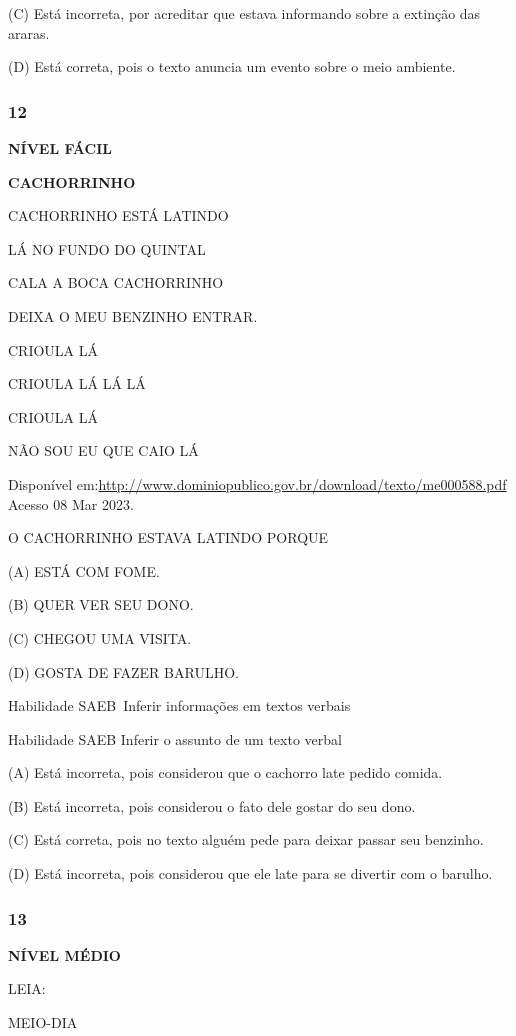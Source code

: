 (C) Está incorreta, por acreditar que estava informando sobre a extinção
das araras.

(D) Está correta, pois o texto anuncia um evento sobre o meio ambiente.

\subsubsection{12}\label{section-105}

\textbf{NÍVEL FÁCIL}

\textbf{CACHORRINHO}

CACHORRINHO ESTÁ LATINDO

LÁ NO FUNDO DO QUINTAL

CALA A BOCA CACHORRINHO

DEIXA O MEU BENZINHO ENTRAR.

CRIOULA LÁ

CRIOULA LÁ LÁ LÁ

CRIOULA LÁ

NÃO SOU EU QUE CAIO LÁ

Disponível
em:\url{http://www.dominiopublico.gov.br/download/texto/me000588.pdf}
Acesso 08 Mar 2023.

O CACHORRINHO ESTAVA LATINDO PORQUE

(A) ESTÁ COM FOME.

(B) QUER VER SEU DONO.

(C) CHEGOU UMA VISITA.

(D) GOSTA DE FAZER BARULHO.

Habilidade SAEB~Inferir informações em textos verbais

Habilidade SAEB Inferir o assunto de um texto verbal

(A) Está incorreta, pois considerou que o cachorro late pedido comida.

(B) Está incorreta, pois considerou o fato dele gostar do seu dono.

(C) Está correta, pois no texto alguém pede para deixar passar seu
benzinho.

(D) Está incorreta, pois considerou que ele late para se divertir com o
barulho.

\subsubsection{13}\label{section-106}

\textbf{NÍVEL MÉDIO}

LEIA:

MEIO-DIA

